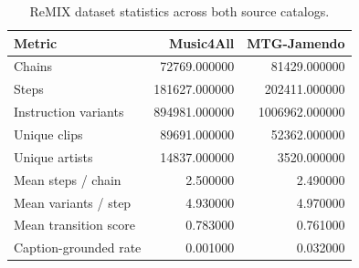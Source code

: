 \begin{table}
\caption{ReMIX dataset statistics across both source catalogs.}
\label{tab:remix_overview}
\begin{tabular}{lrr}
\toprule
Metric & Music4All & MTG-Jamendo \\
\midrule
Chains & 72769.000000 & 81429.000000 \\
Steps & 181627.000000 & 202411.000000 \\
Instruction variants & 894981.000000 & 1006962.000000 \\
Unique clips & 89691.000000 & 52362.000000 \\
Unique artists & 14837.000000 & 3520.000000 \\
Mean steps / chain & 2.500000 & 2.490000 \\
Mean variants / step & 4.930000 & 4.970000 \\
Mean transition score & 0.783000 & 0.761000 \\
Caption-grounded rate & 0.001000 & 0.032000 \\
\bottomrule
\end{tabular}
\end{table}
